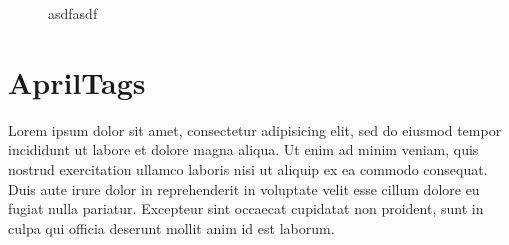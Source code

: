 \documentclass[conference]{IEEEtran}
\begin{document}
\begin{figure}[!h]
  \begin{center}
    \caption{asdfasdf}
    \label{fig:reorder}
  \end{center}
\end{figure}






\section{AprilTags}
\label{sec:apriltags}


Lorem ipsum dolor sit amet, consectetur adipisicing elit, sed do eiusmod tempor incididunt
ut labore et dolore magna aliqua. Ut enim ad minim veniam, quis nostrud exercitation
ullamco laboris nisi ut aliquip ex ea commodo consequat. Duis aute irure dolor in
reprehenderit in voluptate velit esse cillum dolore eu fugiat nulla pariatur. Excepteur
sint occaecat cupidatat non proident, sunt in culpa qui officia deserunt mollit anim id
est laborum.
\end{document}
